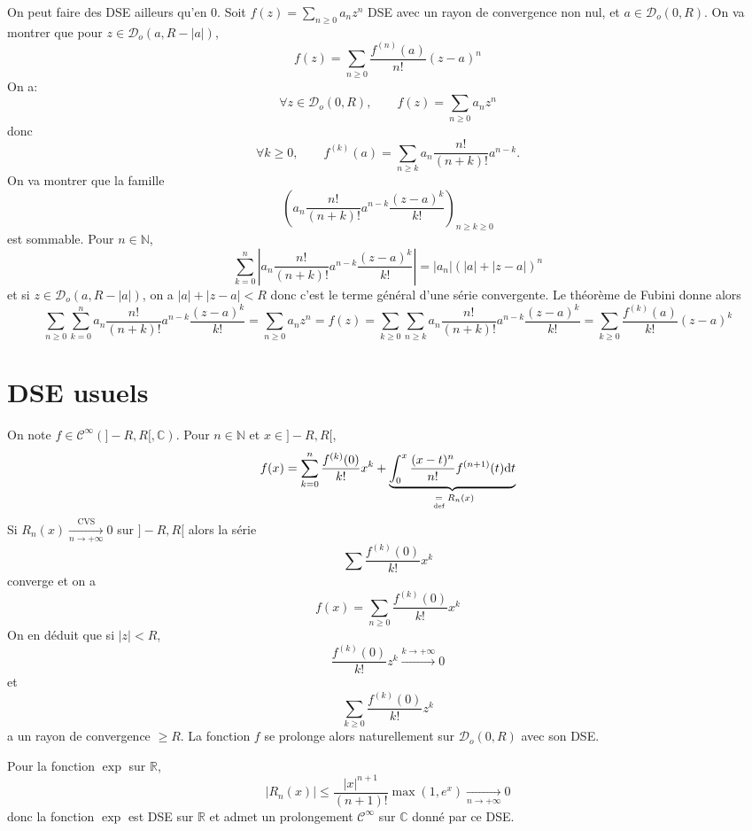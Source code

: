 \begin{rem}
    On peut faire des DSE ailleurs qu'en $0$. Soit $f(z)=\sum_{n\geq 0}a_nz^n$ DSE avec un rayon de convergence non nul, et $a\in\mathcal D_o(0, R)$. On va montrer que pour $z\in\mathcal D_o(a, R-|a|)$, \[
        f(z)=\sum_{n\geq 0}\frac{f^{(n)}(a)}{n!}(z-a)^n
    \]
    On a: \[
        \forall z\in\mathcal D_o(0, R), \qquad f(z)=\sum_{n\geq 0}a_nz^n
    \]
    donc \[\forall k\geq 0, \qquad f^{(k)}(a)=\sum_{n\geq k}a_n\frac{n!}{(n+k)!}a^{n-k}.\]
    On va montrer que la famille \[
        \left( a_n\frac{n!}{(n+k)!}a^{n-k}\frac{(z-a)^k}{k!} \right)_{n\geq k\geq 0}
    \]
    est sommable. Pour $n\in\mathbb N$, \[
        \sum_{k=0}^n \left| a_n\frac{n!}{(n+k)!}a^{n-k}\frac{(z-a)^k}{k!} \right|=|a_n|(|a|+|z-a|)^n
    \]
    et si $z\in\mathcal D_o(a, R-|a|)$, on a $|a|+|z-a|<R$ donc c'est le terme général d'une série convergente. Le théorème de Fubini donne alors \[
        \sum_{n\geq 0}\sum_{k=0}^na_n\frac{n!}{(n+k)!}a^{n-k}\frac{(z-a)^k}{k!}=\sum_{n\geq 0}a_nz^n=f(z)=\sum_{k\geq 0}\sum_{n\geq k}a_n\frac{n!}{(n+k)!}a^{n-k}\frac{(z-a)^k}{k!}=\sum_{k\geq 0}\frac{f^{(k)}(a)}{k!}(z-a)^k
    \]
\end{rem}

\section{DSE usuels}

\begin{rem}
    On note $f\in\mathcal C^\infty(]-R, R[, \mathbb C)$. Pour $n\in\mathbb N$ et $x\in ]-R, R[$, \[
        f(x)=\sum_{k=0}^n\frac{f^{(k)}(0)}{k!}x^k+\underbrace{\int_0^x\frac{(x-t)^n}{n!}f^{(n+1)}(t)\mathrm{d} t}_{\;\underset{\text{def}}=\; R_n(x)}
    \]
    Si $R_n(x)\xrightarrow[n\to+\infty]{\text{CVS}}0$ sur $]-R, R[$ alors la série \[
        \sum \frac{f^{(k)}(0)}{k!}x^k
    \]
    converge et on a \[
        f(x)=\sum_{n\geq 0} \frac{f^{(k)}(0)}{k!}x^k
    \]
    On en déduit que si $|z|<R$, \[
        \frac{f^{(k)}(0)}{k!}z^k\xrightarrow{k\to+\infty}0
    \]
    et \[
        \sum_{k\geq 0}\frac{f^{(k)}(0)}{k!}z^k
    \]
    a un rayon de convergence $\geq R$. La fonction $f$ se prolonge alors naturellement sur $\mathcal D_o(0, R)$ avec son DSE.
\end{rem}

\begin{ex}
    Pour la fonction $\exp$ sur $\mathbb R$, \[
        \left| R_n(x) \right|\leq \frac{|x|^{n+1}}{(n+1)!}\max(1, e^x)\xrightarrow[n\to+\infty]{}0
    \]
    donc la fonction $\exp$ est DSE sur $\mathbb R$ et admet un prolongement $\mathcal C^\infty$ sur $\mathbb C$ donné par ce DSE.
\end{ex}

